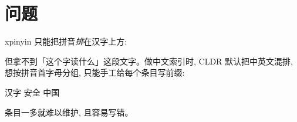 \documentclass{article}
\begin{document}
\section*{问题}

xpinyin 只能把拼音\emph{排}在汉字上方:

\quad{}\quad{}

但拿不到「这个字读什么」这段文字。做中文索引时, CLDR 默认把中英文混排,
想按拼音首字母分组, 只能手工给每个条目写前缀:

汉字\quad
{}安全\quad
{}中国

条目一多就难以维护, 且容易写错。
\end{document}
